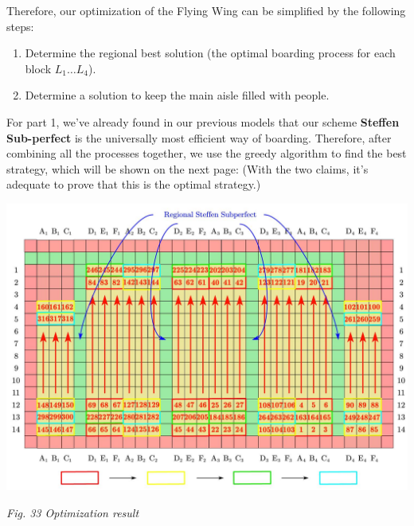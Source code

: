 \documentclass{article}
\theoremstyle{definition}
\theoremstyle{remark}
\numberwithin{equation}{section}
\begin{document}
	Therefore, our optimization of the Flying Wing can be simplified by the following steps:
	\begin{enumerate}
		\item Determine the regional best solution (the optimal boarding process for each block \(L_1 \ldots L_4\)).
		\item Determine a solution to keep the main aisle filled with people.
	\end{enumerate}
	For part 1, we've already found in our previous models that our scheme \textbf{Steffen Sub-perfect} is the universally most efficient way of boarding. Therefore, after combining all the processes together, we use the greedy algorithm to find the best strategy, which will be shown on the next page: (With the two claims, it's adequate to prove that this is the optimal strategy.)

	\begin{center}
		\includegraphics[width = 14cm]{ideal scheme for fw.jpg}

		\small\textit{Fig. 33 Optimization result}
	\end{center}
\end{document}
